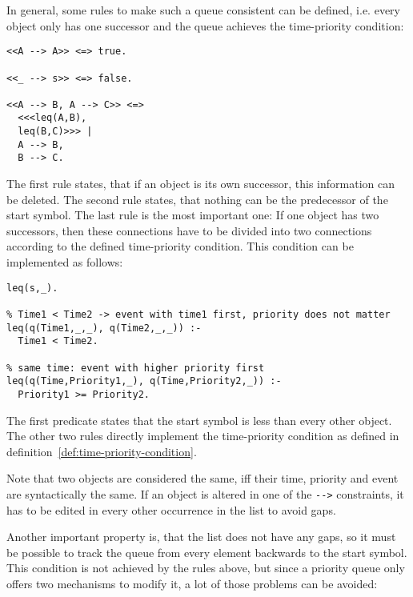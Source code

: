 In general, some rules to make such a queue consistent can be defined, i.e. every object only has one successor and the queue achieves the time-priority condition:

\begin{lstlisting}
<<A --> A>> <=> true.

<<_ --> s>> <=> false.

<<A --> B, A --> C>> <=>
  <<<leq(A,B),
  leq(B,C)>>> |
  A --> B,
  B --> C.
\end{lstlisting}

The first rule states, that if an object is its own successor, this information can be deleted. The second rule states, that nothing can be the predecessor of the start symbol. The last rule is the most important one: If one object has two successors, then these connections have to be divided into two connections according to the defined time-priority condition. This condition can be implemented as follows:

\begin{lstlisting}
leq(s,_).

% Time1 < Time2 -> event with time1 first, priority does not matter
leq(q(Time1,_,_), q(Time2,_,_)) :- 
  Time1 < Time2.

% same time: event with higher priority first
leq(q(Time,Priority1,_), q(Time,Priority2,_)) :- 
  Priority1 >= Priority2.
\end{lstlisting}

The first predicate states that the start symbol is less than every other object. The other two rules directly implement the time-priority condition as defined in definition~\ref{def:time-priority-condition}.

Note that two objects are considered the same, iff their time, priority and event are syntactically the same. If an object is altered in one of the \lstinline|-->| constraints, it has to be edited in every other occurrence in the   list to avoid gaps.

Another important property is, that the list does not have any gaps, so it must be possible to track the queue from every element backwards to the start symbol. This condition is not achieved by the rules above, but since a priority queue only offers two mechanisms to modify it, a lot of those problems can be avoided:


